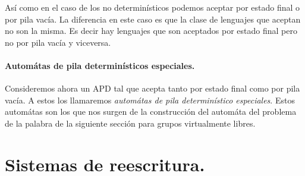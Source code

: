 \documentclass[tesis.tex]{subfiles}
\begin{document}
Así como en el caso de los no determinísticos podemos aceptar por estado final o por pila vacía. La diferencia en este caso es que la clase de lenguajes que aceptan no son la misma. Es decir hay lenguajes que son aceptados por estado final pero no por pila vacía y viceversa.

\paragraph{Automátas de pila determinísticos especiales.} Consideremos ahora un APD tal que acepta tanto por estado final como por pila vacía. A estos los llamaremos \textit{automátas de pila determinístico especiales}.  
Estos automátas son los que nos surgen de la construcción del automáta del problema de la palabra de la siguiente sección para grupos virtualmente libres.

\section{Sistemas de reescritura.}
\end{document}
